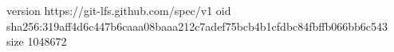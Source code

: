 version https://git-lfs.github.com/spec/v1
oid sha256:319aff4d6c447b6caaa08baaa212c7adef75bcb4b1cfdbc84fbffb066bb6c543
size 1048672
